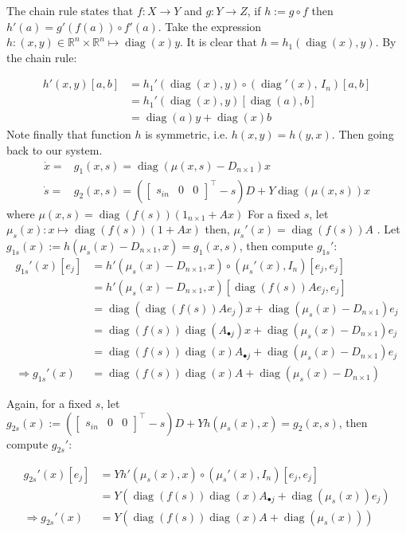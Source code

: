 \documentclass[3p,times]{article}
\newcommand{\R}{\mathbb{R}}
\DeclareMathOperator{\diag}{diag}
\begin{document}
The chain rule states that $f:X \rightarrow Y$ and $g: Y\rightarrow Z$, if $h:= g \circ f$ then $h'(a) = g'(f(a))\circ f'(a)$. 
Take the expression $h: (x,y)\in \R^n\times \R^n \mapsto \diag(x)y$. It is clear that $h = h_1(\diag(x), y) $. By the chain rule:

\begin{align}
h'(x,y)[a,b] &= h_1'(\diag(x),y)\circ( \diag'(x), \, I_n)[a,b] \\
& = h_1'(\diag(x),y)[ \diag(a), b] \\
 &= \diag(a)y + \diag(x)b
\end{align}
Note finally that function $h$ is symmetric, i.e. $h(x,y) = h(y,x)$.
Then going back to our system.
\begin{align}
	\dot{x} = & g_1(x,s)= \diag(\mu(x,s) - D_{n\times 1})x \\
	\dot{s} = & g_2(x,s)= \left(\begin{bmatrix} s_{in}&0&0 \end{bmatrix}^\top-s\right)D + Y\diag(\mu(x,s))x
\end{align} 
where $\mu(x,s) = \diag(f(s))(1_{n\times 1}+Ax)$
For a fixed $s$, let $\mu_s(x): x \mapsto  \diag(f(s))(1+Ax)$ then, $\mu_s'(x) = \diag(f(s))A$ . Let $g_{1s}(x):= h(\mu_s(x) - D_{n\times 1},x)=g_1(x,s)$, then compute $g_{1s}'$:
\begin{align} 
g_{1s}'(x)[e_j]&=h'(\mu_s(x) - D_{n\times 1},x) \circ (\mu_s'(x),I_n)[e_j, e_j]\\
&=h'(\mu_s(x)- D_{n\times 1},x) [\diag(f(s))Ae_j , e_j]  \\
&=\diag(\diag(f(s))Ae_j)x +  \diag(\mu_s(x)- D_{n\times 1})e_j \\
&=\diag(f(s))\diag(A_{\bullet j})x +  \diag(\mu_s(x)- D_{n\times 1})e_j \\
&=\diag(f(s))\diag(x)A_{\bullet j} +  \diag(\mu_s(x)- D_{n\times 1})e_j \\
\Rightarrow  g_{1s}'(x) &= \diag(f(s))\diag(x)A +  \diag(\mu_s(x)- D_{n\times 1})
\end{align}

Again, for a fixed $s$, let $g_{2s}(x):= \left(\begin{bmatrix} s_{in}&0&0 \end{bmatrix}^\top-s\right)D + Yh(\mu_s(x),x)=g_2(x,s)$, then compute $g_{2s}'$:

\begin{align} 
g_{2s}'(x)[e_j]&=Yh'(\mu_s(x),x) \circ (\mu_s'(x),I_n)[e_j, e_j]\\
&=Y\left(\diag(f(s))\diag(x)A_{\bullet j} +  \diag(\mu_s(x))e_j \right) \\
\Rightarrow g_{2s}'(x) &= Y(\diag(f(s))\diag(x)A +  \diag(\mu_s(x)))
\end{align}
\end{document}
